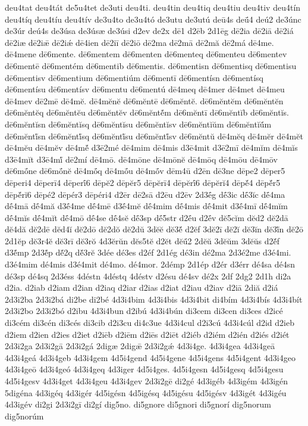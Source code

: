{deu4tat
deu4tát
de5u4tet
de3uti
deu4ti.
deu4tin
deu4tiq
deu4tiu
deu4tiv
deu4tín
deu4tíq
deu4tíu
deu4tív
de3u4to
de3u4tó
de3utu
de3utú
deū4s
deū́4
deú2
de3únc
de3úr
deú4s
de3úsa
de3úsæ
de3úsi
d2ev
de2x
dē1
d2ēb
2d1ēg
dē2ia
dē2iā
dē2iá
dē2iæ
dē2iǣ
dē2iǽ
dē4ien
dē2iī
dē2iō
dē2ma
dē2mā
dē2mă
dē2má
dē4me.
dē4mene
dē6mente.
dē6mentem
dē6menten
dē6menteq
dē6menteu
dē6mentev
dē6mentē
dē6mentém
dē6mentib
dē6mentis.
dē6mentisn
dē6mentisq
dē6mentisu
dē6mentisv
dē6mentium
dē6mentiúm
dē6mentī
dē6mentísn
dē6mentísq
dē6mentísu
dē6mentísv
dē6mentu
dē6mentú
dē4meq
dē4mer
dē4met
dē4meu
dē4mev
dē2mē
dē4mĕ.
dē4mĕnĕ
dē6mĕntē
dē6mĕntĕ.
dē6mĕntĕm
dē6mĕntĕn
dē6mĕntĕq
dē6mĕntĕu
dē6mĕntĕv
dē6mĕntĕ́m
dē6mĕntī
dē6mĕntĭb
dē6mĕntĭs.
dē6mĕntĭsn
dē6mĕntĭsq
dē6mĕntĭsu
dē6mĕntĭsv
dē6mĕntĭŭm
dē6mĕntĭŭ́m
dē6mĕntĭ́sn
dē6mĕntĭ́sq
dē6mĕntĭ́su
dē6mĕntĭ́sv
dē6mĕntŭ
dē4mĕq
dē4mĕr
dē4mĕt
dē4mĕu
dē4mĕv
dē4mĕ́
d3ē2mé
dē4mim
dē4mis
d3ē4mit
d3ē2mī
dē4mĭm
dē4mĭs
d3ē4mĭt
d3ē4mĭ́
dē2mí
dē4mō.
dē4mōne
dē4mōnĕ
dē4mōq
dē4mōu
dē4mōv
dē6mṓne
dē6mṓnĕ
dē4mṓq
dē4mṓu
dē4mṓv
dēm4ū
d2ēn
dē3ne
dēpe2
dēper5
dēperi4
dēperī4
dēperī́6
dēpĕ2
dēpĕr5
dēpĕrī4
dēpĕrī́6
dēpĕrĭ4
dēpĕ́4
dēpĕ́r5
dēpĕ́rĭ6
dēpé2
dēpér3
dēpéri4
d2ēr
dē2sā
d2ēu
d2ēv
2d3ḗg
dḗ3ic
dḗ3ĭc
dḗ4ma
dḗ4mā
dḗ4mă
d3ḗ4me
dḗ4mē
d3ḗ4mĕ
dḗ4mim
dḗ4mis
dḗ4mit
d3ḗ4mī
dḗ4mĭm
dḗ4mĭs
dḗ4mĭt
dḗ4mō
dḗ4se
dḗ4sĕ
dḗ3sp
dḗ5str
d2ḗu
d2ḗv
dĕ5cĭm
dĕd2
dĕ2dā
dĕ4dă
dĕ2dē
dĕd4ĭ
dĕ2dō
dĕ2dŏ
dĕ2dŭ
3dĕĕ
dĕ3ĕ́
d2ĕf
3dĕ2ī
dĕ2ĭ
dĕ3ĭn
dĕ3ĭ́n
dĕ2ō
2d1ĕp
dĕ3r4ĕ
dĕ3rī
dĕ3rŏ
4d3ĕrŭn
dĕs5tĕ
d2ĕt
dĕū́2
2dĕŭ
3dĕŭm
3dĕŭs
d2ĕ́f
d3ĕ́mp
2d3ĕ́p
dĕ́2q
dĕ́3rĕ
3dée
dé3es
d2éf
2d1ég
dé3in
dé2ma
2d3é2me
d3é4mi.
d3é4mim
dé4mis
d3é4mit
dé4mo.
dé4mor.
2démp
2d1ép
d2ér
d3érr
dé4sa
dé4sn
dé3sp
dé4sq
2d3éss
4déstn
4déstq
4déstv
d2ésu
dé4sv
dé2x
2df
2dg2
2d1h
di2a
d2ia.
d2iab
d2iam
d2ian
d2iaq
d2iar
d2ias
d2iat
d2iau
d2iav
d2iā
2diă
d2iá
2d3i2ba
2d3i2bá
di2be
di2bé
4d3i4bim
4d3i4bis
4d3i4bit
di4bím
4d3i4bís
4d3i4bít
2d3i2bo
2d3i2bó
d2ibu
4d3i4bun
d2ibú
4d3i4bún
di3cem
di3cen
di3ces
d2icé
di3cém
di3cén
di3cés
di3cib
d2i3cu
di4c3ue
4d3i4cul
d2i3cú
4d3i4cúl
d2id
d2ieb
d2iem
d2ien
d2ies
d2iet
d2iēb
d2iēm
d2iēs
d2iēt
d2iéb
d2iém
d2ién
d2iés
d2iét
2d3i2ga
2d3i2gā
2d3i2gá
2digæ
2digǣ
2d3i2gǽ
4d3i4ge.
4d3i4gea
4d3i4geā
4d3i4geá
4d3i4geb
4d3i4gem
4d5i4gend
4d5i4gene
4d5i4gens
4d5i4gent
4d3i4geo
4d3i4geō
4d3i4geó
4d3i4geq
4d3iger
4d5i4ges.
4d5i4gesn
4d5i4gesq
4d5i4gesu
4d5i4gesv
4d3i4get
4d3i4geu
4d3i4gev
2d3i2gē
di2gé
4d3igéb
4d3igém
4d3igén
5digéna
4d3igéq
4d3igér
4d5igésn
4d5igésq
4d5igésu
4d5igésv
4d3igét
4d3igéu
4d3igév
di2gi
2d3i2gī
di2gí
dig5no.
di5gnore
di5gnori
di5gnorí
dig5norum
dig5norúm
}
